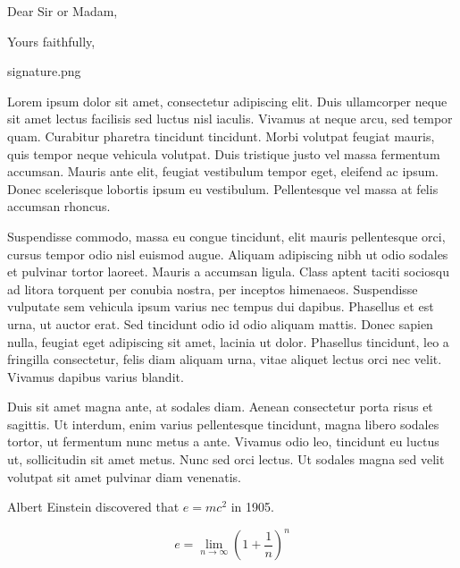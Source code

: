 \documentclass[11pt,a4paper,sans]{moderncv}        %
\begin{document}
\date{\today}
\subject{Job application}
\opening{Dear Sir or Madam,}
\closing{Yours faithfully,}
\signature{0.9}{signature.png}                     %
\makelettertitle

Lorem ipsum dolor sit amet, consectetur adipiscing elit. Duis ullamcorper neque sit amet lectus facilisis sed luctus nisl iaculis. Vivamus at neque arcu, sed tempor quam. Curabitur pharetra tincidunt tincidunt. Morbi volutpat feugiat mauris, quis tempor neque vehicula volutpat. Duis tristique justo vel massa fermentum accumsan. Mauris ante elit, feugiat vestibulum tempor eget, eleifend ac ipsum. Donec scelerisque lobortis ipsum eu vestibulum. Pellentesque vel massa at felis accumsan rhoncus.

Suspendisse commodo, massa eu congue tincidunt, elit mauris pellentesque orci, cursus tempor odio nisl euismod augue. Aliquam adipiscing nibh ut odio sodales et pulvinar tortor laoreet. Mauris a accumsan ligula. Class aptent taciti sociosqu ad litora torquent per conubia nostra, per inceptos himenaeos. Suspendisse vulputate sem vehicula ipsum varius nec tempus dui dapibus. Phasellus et est urna, ut auctor erat. Sed tincidunt odio id odio aliquam mattis. Donec sapien nulla, feugiat eget adipiscing sit amet, lacinia ut dolor. Phasellus tincidunt, leo a fringilla consectetur, felis diam aliquam urna, vitae aliquet lectus orci nec velit. Vivamus dapibus varius blandit.

Duis sit amet magna ante, at sodales diam. Aenean consectetur porta risus et sagittis. Ut interdum, enim varius pellentesque tincidunt, magna libero sodales tortor, ut fermentum nunc metus a ante. Vivamus odio leo, tincidunt eu luctus ut, sollicitudin sit amet metus. Nunc sed orci lectus. Ut sodales magna sed velit volutpat sit amet pulvinar diam venenatis.

Albert Einstein discovered that $e=mc^2$ in 1905.

\[ e=\lim_{n \to \infty} \left(1+\frac{1}{n}\right)^n \]

\makeletterclosing

\end{document}
